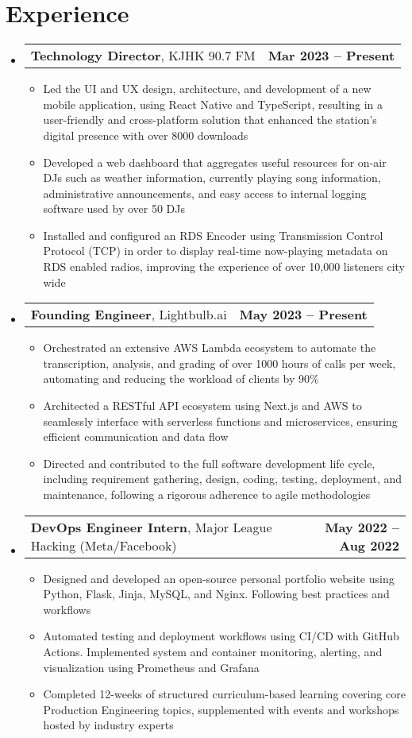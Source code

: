 \documentclass[letter,11pt]{article}
\makeatletter
\newcommand{\resumeItem}[1]{
	\item \small{{#1 \vspace{-2pt}}}
}
\newcommand{\resumeSubheading}[3]{
	\vspace{-2pt}\item
	\begin{tabular*}{1.0\textwidth}[t]{l@{\extracolsep{\fill}}r}
		\textbf{#1}, {\small #2} & \textbf{\small #3} \\
	\end{tabular*}\vspace{-7pt}
}
\newcommand{\resumeSubHeadingListStart}{\begin{itemize}[leftmargin=0.0in, label={}]}
\newcommand{\resumeSubHeadingListEnd}{\end{itemize}}
\newcommand{\resumeItemListStart}{\begin{itemize}[leftmargin=0.5cm]}
\newcommand{\resumeItemListEnd}{\end{itemize}\vspace{-5pt}}
\makeatother
\begin{document}
\section{Experience}
	\resumeSubHeadingListStart
		\resumeSubheading{Technology Director}{KJHK 90.7 FM}{Mar 2023 -- Present}
			\resumeItemListStart
				\resumeItem{Led the UI and UX design, architecture, and development of a new mobile application, using React Native and TypeScript, resulting in a user-friendly and cross-platform solution that enhanced the station's digital presence with over 8000 downloads}
				\resumeItem{Developed a web dashboard that aggregates useful resources for on-air DJs such as weather information, currently playing song information, administrative announcements, and easy access to internal logging software used by over 50 DJs}
				\resumeItem{Installed and configured an RDS Encoder using Transmission Control Protocol (TCP) in order to display real-time now-playing metadata on RDS enabled radios, improving the experience of over 10,000 listeners city wide}
			\resumeItemListEnd
		\resumeSubheading{Founding Engineer}{Lightbulb.ai}{May 2023 -- Present}
			\resumeItemListStart
				\resumeItem{Orchestrated an extensive AWS Lambda ecosystem to automate the transcription, analysis, and grading of over 1000 hours of calls per week, automating and reducing the workload of clients by 90\%}
				\resumeItem{Architected a RESTful API ecosystem using Next.js and AWS to seamlessly interface with serverless functions and microservices, ensuring efficient communication and data flow}
				\resumeItem{Directed and contributed to the full software development life cycle, including requirement gathering, design, coding, testing, deployment, and maintenance, following a rigorous adherence to agile methodologies}
			\resumeItemListEnd
		\resumeSubheading{DevOps Engineer Intern}{Major League Hacking (Meta/Facebook)}{May 2022 -- Aug 2022}
			\resumeItemListStart
				\resumeItem{Designed and developed an open-source personal portfolio website using Python, Flask, Jinja, MySQL, and Nginx. Following best practices and workflows}
				\resumeItem{Automated testing and deployment workflows using CI/CD with GitHub Actions. Implemented system and container monitoring, alerting, and visualization using Prometheus and Grafana}
				\resumeItem{Completed 12-weeks of structured curriculum-based learning covering core Production Engineering topics, supplemented with events and workshops hosted by industry experts}
			\resumeItemListEnd
	\resumeSubHeadingListEnd
\vspace{-15pt}
\end{document}
